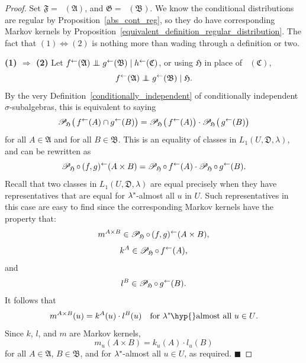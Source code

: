 \documentclass[
twoside=true,
paper=letter,
fontsize=9pt,
pagesize=auto,
leqno,
openany,
headsepline,
overfullrule,
]{scrbook}
\theoremstyle{plain}
\theoremstyle{plain}
\theoremstyle{definition}
\theoremstyle{bfnoteitalic}
\theoremstyle{bfnoteroman}
\newcommand{\sigalg}[1]{\mathfrak{#1}}
\newcommand{\cali}[1]{\mathscr{#1}}
\renewcommand{\qedsymbol}{$\blacksquare$}
\newcommand{\condprobsub}[2]
{\mathop{\cali{P}\hspace{-1.5pt}}\nolimits_{#2}\hspace{-1pt}\left(#1\right)}
\newcommand{\condprobop}[1]{\mathop{\cali{P}\hspace{-1pt}}\nolimits_{#1}}
\newcommand{\textsigma}{\hbox{\large{$\sigma$}}\kern-1pt}
\newcommand{\preimage}[1]{\mathop{#1^{\leftarrow}}}
\newcommand{\meets}{\cap}
\newcommand{\sigmaalgebra}{\sigalg{A}}
\newcommand{\sigmaalgebraii}{\sigalg{B}}
\newcommand{\sigmaalgebraiii}{\sigalg{C}}
\newcommand{\kernast}{\ast\kern-1pt}
\newcommand{\lilstrut}{\vphantom{\bigl(}}
\newcommand{\funcf}{f}
\newcommand{\funcg}{g}
\newcommand{\funch}{h}
\newcommand{\funck}{k}
\newcommand{\funcl}{l}
\newcommand{\funcm}{m}
\newcommand{\measureiii}{\lambda}
\newcommand{\measlambda}{\lambda}
\newcommand{\seti}{A}
\newcommand{\setii}{B}
\newcommand{\uspace}{U}%
\newcommand{\uspaceelt}{u}
\newcommand{\uspacesig}{\sigalg{D}}
\newcommand{\condindep}[3]{#1\perp\kern-6pt\perp #2\mid #3}
\begin{document}
\begin{proof}
Set
$\sigalg{F}=\preimage{\funcf}(\sigmaalgebra)$,
and $\sigalg{G}=\preimage{\funcg}(\sigmaalgebraii)$.
We know the conditional distributions
are regular by Proposition~\ref{abs_cont_reg}, so they do have corresponding Markov kernels by Proposition~\ref{equivalent_definition_regular_distribution}.
The fact that $(1) \Leftrightarrow (2)$ is nothing more than wading through a definition or two.

\textbf{(1) $\Rightarrow$ (2)}\quad
Let
$\condindep{\preimage{\funcf}(\sigmaalgebra)}{\preimage{\funcg}(\sigmaalgebraii)}
{\preimage{\funch}(\sigmaalgebraiii)}$, or using $\sigalg{H}$ in place of
$\preimage{\funch}(\sigmaalgebraiii)$,
\[
\condindep{\preimage{\funcf}(\sigmaalgebra)}{\preimage{\funcg}(\sigmaalgebraii)}
{\sigalg{H}}.
\]
By the very Definition~\ref{conditionally_independent} of conditionally independent \textsigma\hyp{}subalgebras,
this is equivalent to saying
\[
\condprobsub{\lilstrut\preimage{\funcf}(\seti) \meets \preimage{\funcg}(\setii)}{\sigalg{H}}
=
\condprobsub{\lilstrut\preimage{\funcf}(\seti)}{\sigalg{H}}
\cdot
\condprobsub{\lilstrut\preimage{\funcg}(\setii)}{\sigalg{H}}
\]
for all $\seti\in\sigmaalgebra$ and for all $\setii\in\sigmaalgebraii$.
This is an equality of classes in
$L_1(\uspace,\uspacesig,\measureiii)$, and can be rewritten as
\begin{equation}
\condprobop{\sigalg{H}} \circ \preimage{(\funcf,\funcg)}
(\seti\times\setii)
=
\condprobop{\sigalg{H}}\circ \preimage{\funcf}(\seti)
\cdot
\condprobop{\sigalg{H}}\circ \preimage{\funcg}(\setii).
\end{equation}
Recall that two classes in
$L_1(\uspace,\uspacesig,\measureiii)$
are equal precisely when they have representatives that are equal for
$\measlambda^\kernast$\hyp{}almost all $\uspaceelt$ in  $\uspace$.
Such representatives in this case are easy to find since
the corresponding Markov kernels have the property that:
\[
\funcm^{\seti\times\setii} \in
\condprobop{\sigalg{H}} \circ \preimage{(\funcf,\funcg)}
(\seti\times\setii),
\]
\[
\funck^\seti \in
\condprobop{\sigalg{H}}\circ \preimage{\funcf}(\seti),
\]
and
\[
\funcl^\setii \in
\condprobop{\sigalg{H}}\circ \preimage{\funcg}(\setii).
\]
It follows that
\[
\funcm^{\seti\times\setii}(\uspaceelt)
=
\funck^\seti(\uspaceelt)
\cdot
\funcl^\setii(\uspaceelt)
\quad
\text{for $\measlambda^\kernast$\hyp{}almost all $\uspaceelt\in\uspace$.}
\]
Since $\funck$, $\funcl$, and $\funcm$ are Markov kernels,
\[
\funcm_\uspaceelt(\seti\times\setii)
=
\funck_\uspaceelt(\seti)
\cdot
\funcl_\uspaceelt(\setii)
\]
for all $\seti\in\sigmaalgebra$, $\setii\in\sigmaalgebraii$, and for
$\measlambda^\kernast$\hyp{}almost all $\uspaceelt\in\uspace$, as required.
\hfill\qedsymbol


\end{proof}
\end{document}
